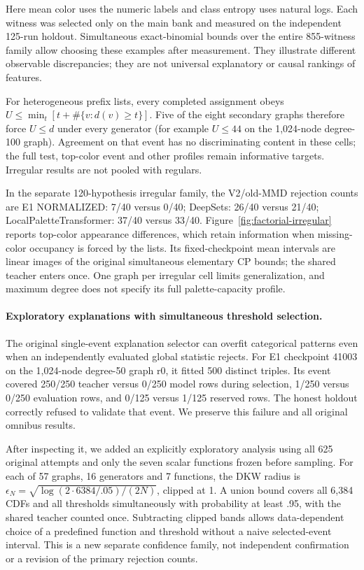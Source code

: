 Here mean color uses the numeric labels and class entropy uses natural logs.
Each witness was selected only on the main bank and measured on the independent
125-run holdout. Simultaneous exact-binomial bounds over the entire 855-witness
family allow choosing these examples after measurement. They illustrate
different observable discrepancies; they are not universal explanatory or
causal rankings of features.

For heterogeneous prefix lists, every completed assignment obeys
$U\le\min_t[t+\#\{v:d(v)\ge t\}]$. Five of the eight secondary graphs
therefore force $U\le d$ under every generator (for example $U\le44$ on the
1,024-node degree-100 graph). Agreement on that event has no discriminating
content in these cells; the full test, top-color event and other profiles
remain informative targets. Irregular results are not pooled with regulars.

In the separate 120-hypothesis irregular family, the V2/old-MMD rejection counts are E1 NORMALIZED: 7/40 versus 0/40; DeepSets: 26/40 versus 21/40; LocalPaletteTransformer: 37/40 versus 33/40. Figure~\ref{fig:factorial-irregular} reports top-color appearance differences,
which retain information when missing-color occupancy is forced by the lists.
Its fixed-checkpoint mean intervals are linear images of the original
simultaneous elementary CP bounds; the shared teacher enters once. One graph
per irregular cell limits generalization, and maximum degree does not specify
its full palette-capacity profile.

\paragraph{Exploratory explanations with simultaneous threshold selection.}
The original single-event explanation selector can overfit categorical
patterns even when an independently evaluated global statistic rejects.
For E1 checkpoint 41003 on the 1,024-node degree-50 graph r0, it fitted 500
distinct triples. Its event covered 250/250 teacher versus 0/250 model rows
during selection, 1/250 versus 0/250 evaluation rows, and 0/125 versus 1/125
reserved rows. The honest holdout correctly refused to validate that event.
We preserve this failure and all original omnibus results.

After inspecting it, we added an explicitly exploratory analysis using all 625
original attempts and only the seven scalar functions frozen before sampling.
For each of 57 graphs, 16 generators and 7 functions, the DKW radius is
$\epsilon_N=\sqrt{\log(2\cdot6384/.05)/(2N)}$, clipped at 1. A union bound
covers all 6,384 CDFs and all thresholds simultaneously with probability at
least .95, with the shared teacher counted once. Subtracting clipped bands
allows data-dependent choice of a predefined function and threshold without
a naive selected-event interval. This is a new separate confidence family,
not independent confirmation or a revision of the primary rejection counts.

